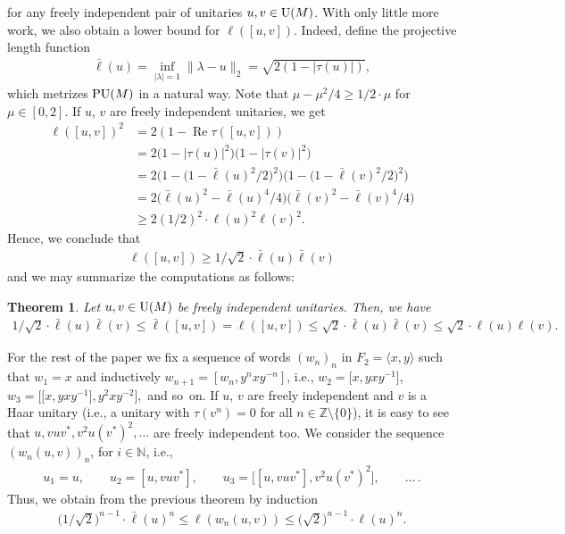 \documentclass[pdftex]{sigma}
\numberwithin{equation}{section}
\newtheorem{Theorem}{Theorem}[section]
\begin{document}
for any freely independent pair of unitaries $u,v \in {\rm U}(M)$. With only little more work, we also obtain a lower bound for $\ell([u,v])$.
Indeed, define the projective length function
\begin{gather*}
\bar \ell(u) = \inf_{|\lambda|=1 } \|\lambda - u\|_2 = \sqrt{2(1-|\tau(u)|)},
\end{gather*}
which metrizes ${\rm PU}(M)$ in a natural way. Note that
$\mu - \mu^2/4 \geq 1/2 \cdot \mu$ for $\mu \in [0,2]$. If $u$, $v$ are freely independent unitaries, we get
\begin{align*}
\ell([u,v])^2 &= 2(1 - \operatorname{Re} \tau([u,v])) \\
&= 2 \big(1-|\tau(u)|^2\big)\big(1- |\tau(v)|^2\big) \\
&= 2 \big(1-\big(1-\bar\ell(u)^2/2\big)^2\big) \big(1-\big(1-\bar\ell(v)^2/2\big)^2\big) \\
&= 2 \big( \bar \ell(u)^2 - \bar \ell(u)^4/4\big) \big( \bar \ell(v)^2 - \bar \ell(v)^4/4\big) \\
&\geq 2 (1/2)^2 \cdot \ell(u)^2 \ell(v)^2.
\end{align*}
Hence, we conclude that
\begin{gather*}
\ell([u,v]) \geq 1/\sqrt{2} \cdot \bar \ell(u) \bar \ell(v)
\end{gather*}
and we may summarize the computations as follows:
\begin{Theorem}
Let $u,v \in {\rm U}(M)$ be freely independent unitaries. Then, we have
\begin{gather*}
1/\sqrt{2} \cdot \bar \ell(u) \bar \ell(v) \leq \bar\ell([u,v])= \ell([u,v]) \leq \sqrt{2} \cdot \bar \ell(u) \bar \ell(v) \leq \sqrt{2} \cdot \ell(u) \ell(v).
\end{gather*}
\end{Theorem}

For the rest of the paper we fix a sequence of words $(w_n)_n$ in $F_2= \langle x,y \rangle$ such that $w_1=x$ and inductively $w_{n+1} = [w_n,y^{n}xy^{-n}]$, i.e., $w_2=\big[x,yxy^{-1}\big]$, $w_3=\big[\big[x,yxy^{-1}\big],y^2xy^{-2}\big],$ and so~on. If $u$, $v$ are freely independent and $v$ is a Haar unitary (i.e., a unitary with $\tau(v^n)=0$ for all $n \in \mathbb Z \setminus \{0\}$), it is easy to see that $ u,vuv^*,v^2u(v^*)^2,\dots$ are freely independent too. We consider the sequence $(w_n(u,v))_n$, for $i \in \mathbb N$, i.e.,
\begin{gather*}
u_1=u, \qquad
u_2=[u,vuv^*], \qquad
u_3=\big[[u,vuv^*],v^2u(v^*)^2 \big],\qquad \dots\,.
\end{gather*}
Thus, we obtain from the previous theorem by induction
\begin{gather*}
\big(1/\sqrt{2}\big)^{n-1} \cdot \bar\ell(u)^n \leq \ell(w_n(u,v)) \leq \big(\sqrt{2}\big)^{n-1} \cdot \ell(u)^n.
\end{gather*}
\end{document}
